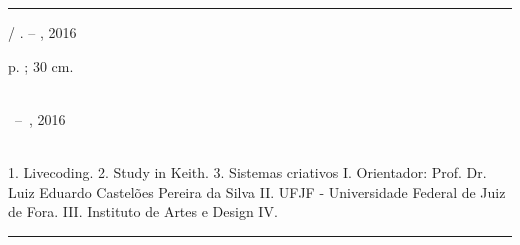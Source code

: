 %
%     
\begin{fichacatalografica}
	\vspace*{\fill}					%
	\hrule							%
	\begin{center}					%
	\begin{minipage}[c]{12.5cm}		%
	
	\imprimirautor
	
	\hspace{0.5cm} \imprimirtitulo  / \imprimirautor. --
	\imprimirlocal, 2016
	
	\hspace{0.5cm} \pageref{LastPage} p. ; 30 cm.\\
	
	\hspace{0.5cm} \imprimirorientadorRotulo~\imprimirorientador\\
	
	\hspace{0.5cm}
	\parbox[t]{\textwidth}{\imprimirtipotrabalho~--~\imprimirinstituicao,
	2016	
	}\\
	
	\hspace{0.5cm}
		1. Livecoding.
		2. Study in Keith.
		3. Sistemas criativos
		I. Orientador: Prof. Dr. Luiz Eduardo Castelões Pereira da Silva
		II. UFJF - Universidade Federal de Juiz de Fora.
		III. Instituto de Artes e Design
		IV. \imprimirtitulo \\ 			
	
	\end{minipage}
	\end{center}
	\hrule
\end{fichacatalografica}
